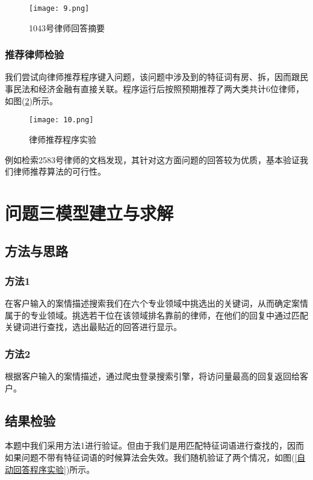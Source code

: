 \documentclass[bwprint]{cumcmthesis}
\begin{document}
\begin{figure}[!htp]
\centering
\texttt{[image: 9.png]}
\caption{1043号律师回答摘要}
\label{1043号律师回答摘要}
\end{figure}

\subsubsection*{推荐律师检验}

我们尝试向律师推荐程序键入问题，该问题中涉及到的特征词有房、拆，因而跟民事民法和经济金融有直接关联。程序运行后按照预期推荐了两大类共计6位律师，如图(\ref{律师推荐程序实验})所示。

\begin{figure}[!htp]
\centering
\texttt{[image: 10.png]}
\caption{律师推荐程序实验}
\label{律师推荐程序实验}
\end{figure}


例如检索2583号律师的文档发现，其针对这方面问题的回答较为优质，基本验证我们律师推荐算法的可行性。

\section{问题三模型建立与求解}
\subsection{方法与思路}
\subsubsection*{方法1}

在客户输入的案情描述搜索我们在六个专业领域中挑选出的关键词，从而确定案情属于的专业领域。挑选若干位在该领域排名靠前的律师，在他们的回复中通过匹配关键词进行查找，选出最贴近的回答进行显示。

\subsubsection*{方法2}

根据客户输入的案情描述，通过爬虫登录搜索引擎，将访问量最高的回复返回给客户。

\subsection{结果检验}

本题中我们采用方法1进行验证。但由于我们是用匹配特征词语进行查找的，因而如果问题不带有特征词语的时候算法会失效。我们随机验证了两个情况，如图(\ref{自动回答程序实验})所示。
\end{document}

